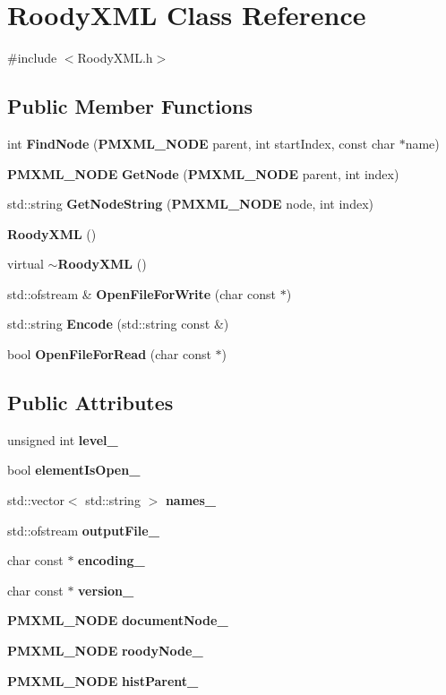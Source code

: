 \section{RoodyXML Class Reference}
\label{classRoodyXML}


{\ttfamily \#include $<$RoodyXML.h$>$}

\subsection*{Public Member Functions}
\begin{DoxyCompactItemize}
\item 
int {\bf FindNode} ({\bf PMXML\_\-NODE} parent, int startIndex, const char $\ast$name)
\item 
{\bf PMXML\_\-NODE} {\bf GetNode} ({\bf PMXML\_\-NODE} parent, int index)
\item 
std::string {\bf GetNodeString} ({\bf PMXML\_\-NODE} node, int index)
\item 
{\bf RoodyXML} ()
\item 
virtual {\bf $\sim$RoodyXML} ()
\item 
std::ofstream \& {\bf OpenFileForWrite} (char const $\ast$)
\item 
std::string {\bf Encode} (std::string const \&)
\item 
bool {\bf OpenFileForRead} (char const $\ast$)
\end{DoxyCompactItemize}
\subsection*{Public Attributes}
\begin{DoxyCompactItemize}
\item 
unsigned int {\bf level\_\-}
\item 
bool {\bf elementIsOpen\_\-}
\item 
std::vector$<$ std::string $>$ {\bf names\_\-}
\item 
std::ofstream {\bf outputFile\_\-}
\item 
char const $\ast$ {\bf encoding\_\-}
\item 
char const $\ast$ {\bf version\_\-}
\item 
{\bf PMXML\_\-NODE} {\bf documentNode\_\-}
\item 
{\bf PMXML\_\-NODE} {\bf roodyNode\_\-}
\item 
{\bf PMXML\_\-NODE} {\bf histParent\_\-}
\end{DoxyCompactItemize}


